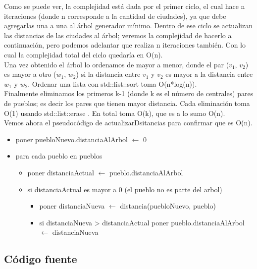 Como se puede ver, la complejidad est\'a dada por el primer ciclo, el cual hace n iteraciones (donde n corresponde a la cantidad de ciudades), ya que debe agregarlas una a una al \'arbol generador m\'inimo. Dentro de ese ciclo se actualizan las distancias de las ciudades al \'arbol; veremos la complejidad de hacerlo a continuaci\'on, pero podemos adelantar que realiza n iteraciones tambi\'en. Con lo cual la complejidad total del ciclo quedar\'ia en O(n).\\
Una vez obtenido el \'arbol lo ordenamos de mayor a menor, donde el par ($v_1$, $v_2$) es mayor a otro ($w_1$, $w_2$) si la distancia entre $v_1$ y $v_2$ es mayor a la distancia entre $w_1$ y $w_2$. Ordenar una lista con std::list::sort toma O(n*log(n)). \cite{sort}\\
Finalmente eliminamos los primeros k-1 (donde k es el n\'umero de centrales) pares de pueblos; es decir los pares que tienen mayor distancia. Cada eliminaci\'on toma O(1) usando std::list::erase \cite{erase}. En total toma O(k), que es a lo sumo O(n).\\

Vemos ahora el pseudoc\'odigo de actualizarDsitancias para confirmar que es O(n).\\

\begin{itemize}
\item poner puebloNuevo.distanciaAlArbol $\leftarrow$ 0
\item para cada pueblo en pueblos
\begin{itemize}
	\item poner distanciaActual $\leftarrow$ pueblo.distanciaAlArbol
	\item si distanciaActual es mayor a 0 (el pueblo no es parte del arbol)
	\begin{itemize}
		\item poner distanciaNueva $\leftarrow$ distancia(puebloNuevo, pueblo)
		\item si distanciaNueva > distanciaActual poner pueblo.distanciaAlArbol $\leftarrow$ distanciaNueva
	\end{itemize}
\end{itemize}
\end{itemize}

\newpage

\subsection{C\'odigo fuente}

